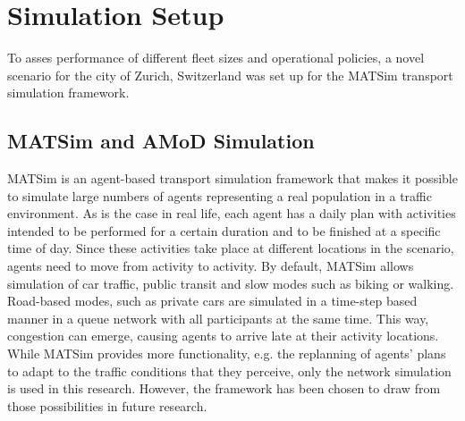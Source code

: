\section{Simulation Setup}

To asses performance of different fleet sizes and operational policies, a novel scenario for the city of Zurich, Switzerland was set up for the MATSim transport simulation framework.


\subsection{MATSim and AMoD Simulation}

MATSim \citep{Horni2015} is an agent-based transport simulation framework that makes it possible to simulate large numbers of agents representing a real population in a traffic environment. As is the case in real life, each agent has a daily plan with activities intended to be performed for a certain duration and to be finished at a specific time of day. Since these activities take place at different locations in the scenario, agents need to move from activity to activity. By default, MATSim allows simulation of car traffic, public transit and slow modes such as biking or walking. Road-based modes, such as private cars are simulated in a time-step based manner in a queue network with all participants at the same time. This way, congestion can emerge, causing agents to arrive late at their activity locations. While MATSim provides more functionality, e.g. the replanning of agents’ plans to adapt to the traffic conditions that they perceive, only the network simulation is used in this research. However, the framework has been chosen to draw from those possibilities in future research.


